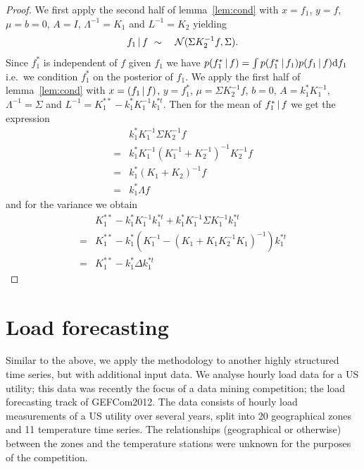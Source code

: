 \documentclass[twoside]{article}
\begin{document}
\begin{proof}
We first apply the second half of lemma~\ref{lem:cond} with $x=f_1$, $y=f$, $\mu=b=0$, $A=I$, $\Lambda^{-1} = K_1$ and $L^{-1} = K_2$ yielding
\begin{eqnarray}
f_1 \,|\, f & \ \sim\  & \mathcal{N}(\Sigma K_2^{-1}f, \Sigma).
\end{eqnarray}
Since $f_1^*$ is independent of $f$ given $f_1$ we have $p(f_1^* \,|\, f) = \int p(f_1^* \,|\, f_1) p(f_1 \,|\, f) \textrm{d}f_1$ i.e.~we condition $f_1^*$ on the posterior of $f_1$.
We apply the first half of lemma~\ref{lem:cond} with $x=(f_1\,|\, f)$, $y=f_1^*$, $\mu=\Sigma K_2^{-1}f$, $b=0$, $A = k_1^*K_1^{-1}$, $\Lambda^{-1}=\Sigma$ and $L^{-1} = K_1^{**} - k_1^*K_1^{-1}k_1^{*t}$.
Then for the mean of $f_1^* \,|\, f$ we get the expression
\begin{eqnarray}
& k_1^*K_1^{-1} \Sigma K_2^{-1}f \\
= & k_1^*K_1^{-1} (K_1^{-1} + K_2^{-1})^{-1} K_2^{-1}f \\
= & k_1^*(K_1 + K_2)^{-1}f \\
= & k_1^*\Lambda f
\end{eqnarray}
and for the variance we obtain
\begin{eqnarray}
& K_1^{**} - k_1^*K_1^{-1}k_1^{*t} + k_1^*K_1^{-1} \Sigma K_1^{-1}k_1^{*t} \\
= & K_1^{**} - k_1^*(K_1^{-1} - (K_1 + K_1K_2^{-1}K_1)^{-1})k_1^{*t} \\
= & K_1^{**} - k_1^*\Delta k_1^{*t}
\end{eqnarray}
\end{proof}




\section{Load forecasting}

Similar to the above, we apply the methodology to another highly structured time series, but with additional input data.
We analyse hourly load data for a US utility; this data was recently the focus of a data mining competition; the load forecasting track of GEFCom2012\footnotemark.
The data consists of hourly load measurements of a US utility over several years, split into 20 geographical zones and 11 temperature time series.
The relationships (geographical or otherwise) between the zones and the temperature stations were unknown for the purposes of the competition.
\end{document}
